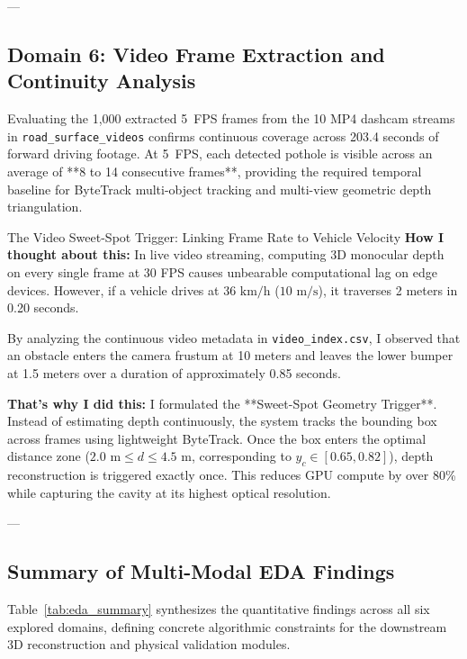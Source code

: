 ---

\subsection{Domain 6: Video Frame Extraction and Continuity Analysis}
Evaluating the 1,000 extracted 5~FPS frames from the 10 MP4 dashcam streams in \texttt{road\_surface\_videos} confirms continuous coverage across 203.4 seconds of forward driving footage. At 5~FPS, each detected pothole is visible across an average of **8 to 14 consecutive frames**, providing the required temporal baseline for ByteTrack multi-object tracking and multi-view geometric depth triangulation.

\begin{designreflection}{The Video Sweet-Spot Trigger: Linking Frame Rate to Vehicle Velocity}
\textbf{How I thought about this:}
In live video streaming, computing 3D monocular depth on every single frame at 30 FPS causes unbearable computational lag on edge devices. However, if a vehicle drives at $36\text{ km/h}$ ($10\text{ m/s}$), it traverses 2 meters in 0.20 seconds. 

By analyzing the continuous video metadata in \texttt{video\_index.csv}, I observed that an obstacle enters the camera frustum at 10 meters and leaves the lower bumper at 1.5 meters over a duration of approximately 0.85 seconds.

\textbf{That's why I did this:}
I formulated the **Sweet-Spot Geometry Trigger**. Instead of estimating depth continuously, the system tracks the bounding box across frames using lightweight ByteTrack. Once the box enters the optimal distance zone ($2.0\text{ m} \le d \le 4.5\text{ m}$, corresponding to $y_c \in [0.65, 0.82]$), depth reconstruction is triggered exactly once. This reduces GPU compute by over 80\% while capturing the cavity at its highest optical resolution.
\end{designreflection}

---

\subsection{Summary of Multi-Modal EDA Findings}
Table~\ref{tab:eda_summary} synthesizes the quantitative findings across all six explored domains, defining concrete algorithmic constraints for the downstream 3D reconstruction and physical validation modules.

